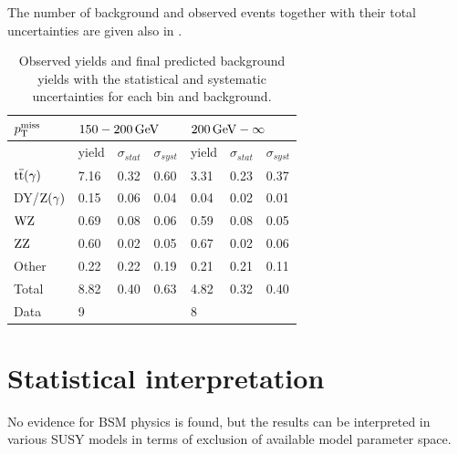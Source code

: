 The number of background and observed events together with their total uncertainties are given also in .
\begin{table}[tbp]
 \centering
 \caption{Observed yields and final predicted background yields with the statistical and systematic uncertainties for each bin and background.}
 \normalsize
 \label{tab:results}
 \begin{tabular}{lllllll}
  $p_{\mathrm{T}}^\text{miss}$      & \multicolumn{3}{l}{$150-200\,\text{Ge\hspace{-.08em}V}$} & \multicolumn{3}{l}{$200\,\text{Ge\hspace{-.08em}V}-\infty$}                                                               \\\hline
                 & yield                             & $\sigma_{stat}$                      & $\sigma_{syst}$ & yield & $\sigma_{stat}$ & $\sigma_{syst}$ \\\hline
  ${\mathrm{t}\overline{\mathrm{t}}}(\gamma)$ & 7.16                              & 0.32                                 & 0.60            & 3.31  & 0.23            & 0.37            \\
  DY/$\mathrm{Z}(\gamma)$ & 0.15                              & 0.06                                 & 0.04            & 0.04  & 0.02            & 0.01            \\
  $\mathrm{W}\mathrm{Z}$       & 0.69                              & 0.08                                 & 0.06            & 0.59  & 0.08            & 0.05            \\
  $\mathrm{Z}\mathrm{Z}$       & 0.60                              & 0.02                                 & 0.05            & 0.67  & 0.02            & 0.06            \\
  Other          & 0.22                              & 0.22                                 & 0.19            & 0.21  & 0.21            & 0.11            \\\hline
  Total          & 8.82                              & 0.40                                 & 0.63            & 4.82  & 0.32            & 0.40            \\\hline
  Data           & 9                                 &                                      &                 & 8     &                 &                 \\\hline
 \end{tabular}
\end{table}


\section{Statistical interpretation}
No evidence for BSM physics is found, but the results can be interpreted in various SUSY models in terms of exclusion of available model parameter space.
